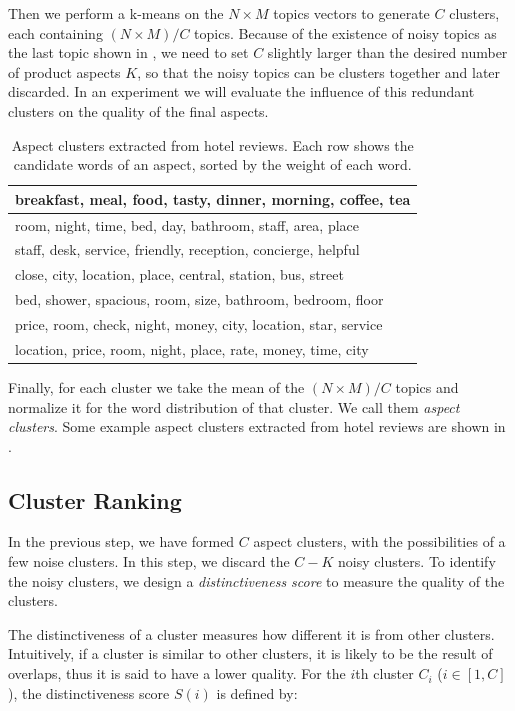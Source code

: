 Then we perform a k-means on the $N\times M$ topics vectors to 
generate $C$ clusters, each containing $(N\times M)/C$ topics.
Because of the existence of noisy topics as the last topic shown 
in , we need to set $C$ slightly larger than 
the desired number of product aspects $K$,
so that the noisy topics can be clusters together and later discarded. 
In an experiment we will evaluate the influence of this redundant clusters on 
the quality of the final aspects.

\begin{table}[th]
\caption{Aspect clusters extracted from hotel reviews.
Each row shows the candidate words of an aspect, sorted by the weight of each word.}
\label{table:step3}
\centering
\begin{tabular}{|l|} \hline
breakfast, meal, food, tasty, dinner, morning, coffee, tea \\\hline
room, night, time, bed, day, bathroom, staff, area, place \\\hline
staff, desk, service, friendly, reception, concierge, helpful \\\hline
close, city, location, place, central, station, bus, street\\\hline
bed, shower, spacious, room, size, bathroom, bedroom, floor \\\hline
price, room, check, night, money, city, location, star, service \\\hline
location, price, room, night, place, rate, money, time, city  \\\hline
\end{tabular}
\end{table}

Finally, for each cluster we take the mean of the $(N\times M)/C$ topics and normalize it
for the word distribution of that cluster.
We call them {\em aspect clusters}.
Some example aspect clusters extracted from hotel reviews are 
shown in .

\subsection{Cluster Ranking}

In the previous step, we have formed $C$ aspect clusters, with the possibilities
of a few noise clusters.  In this step,
we discard the $C-K$ noisy clusters. 
To identify the noisy clusters, we design a {\em distinctiveness score} 
to measure the quality of the clusters. 

The distinctiveness of a cluster measures how different it is 
from other clusters. Intuitively, if a cluster is 
similar to other clusters, it is likely to be the result of overlaps,
thus it is said to have a lower quality. 
For the $i$th cluster $C_i$ ($i\in [1, C]$), 
the distinctiveness score $S(i)$ is defined by:

